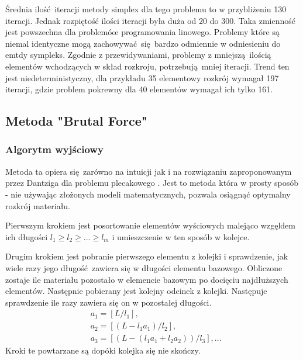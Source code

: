 Średnia ilość iteracji metody simplex dla tego problemu to w przybliżeniu 130 iteracji. Jednak rozpiętość ilości iteracji była duża od 20 do 300. Taka zmienność jest powszechna dla problemóœ programowania linowego. Problemy które są niemal identyczne mogą zachowywać się bardzo odmiennie w odniesieniu do emtdy sympleks. Zgodnie z przewidywaniami, problemy z mniejszą ilością elementów wchodzących w skład rozkroju, potrzebują mniej iteracji. Trend ten jest niedeterministyczny, dla przykładu 35 elementowy rozkrój wymagał 197 iteracji, gdzie problem pokrewny dla 40 elementów wymagał ich tylko 161.

\subsection{Metoda "Brutal Force"}\label{brutalForce}
\subsubsection{Algorytm wyjściowy}
Metoda ta opiera się zarówno na intuicji jak i na rozwiązaniu zaproponowanym przez Dantziga dla problemu plecakowego \cite{DantzigArticle}. Jest to metoda która w prosty sposób - nie używając złożonych modeli matematycznych, pozwala osiągnąć optymalny rozkrój materiału.

Pierwszym krokiem jest posortowanie elementów wyściowych malejąco wzgęldem ich długości $l_1 \ge l_2 \ge ... \ge l_m$ i umieszczenie w ten sposób w kolejce.

Drugim krokiem jest pobranie pierwszego elementu z kolejki i sprawdzenie, jak wiele razy jego długość zawiera się w długości elementu bazowego. Obliczone zostaje ile materiału pozostało w elemencie bazowym po docięciu najdłuższych elementów. Następnie pobierany jest kolejny odcinek z kolejki. Następuje sprawdzenie ile razy zawiera się on w pozostałej długości.
\begin{equation}\label{base_dantizg}
\begin{split}
& a_1 = [L/l_1],\\
& a_2 = [(L-l_1 a_1)/l_2],\\
& a_3 = [(L-(l_1 a_1+l_2 a_2))/l_3], ...
\end{split}
\end{equation}
Kroki te powtarzane są dopóki kolejka się nie skończy.


